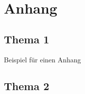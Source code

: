 \appendix
\chapter{Anhang}\label{chp:AnhangA}
\section*{Thema 1}\label{sec:AnhangA1}

Beispiel für einen Anhang

\section*{Thema 2}\label{sec:AnhangA2}

